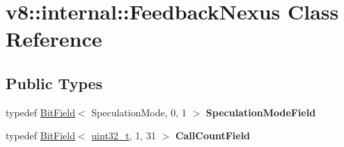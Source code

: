 \hypertarget{classv8_1_1internal_1_1FeedbackNexus}{}\section{v8\+:\+:internal\+:\+:Feedback\+Nexus Class Reference}
\label{classv8_1_1internal_1_1FeedbackNexus}
\subsection*{Public Types}
\begin{DoxyCompactItemize}
\item 
\mbox{\label{classv8_1_1internal_1_1FeedbackNexus_a691c59a60c2e5dfd819156c987736cb7}} 
typedef \mbox{\hyperlink{classv8_1_1internal_1_1BitField}{Bit\+Field}}$<$ Speculation\+Mode, 0, 1 $>$ {\bfseries Speculation\+Mode\+Field}
\item 
\mbox{\label{classv8_1_1internal_1_1FeedbackNexus_a9a255119582a0d71f400f9638e542c44}} 
typedef \mbox{\hyperlink{classv8_1_1internal_1_1BitField}{Bit\+Field}}$<$ \mbox{\hyperlink{classuint32__t}{uint32\+\_\+t}}, 1, 31 $>$ {\bfseries Call\+Count\+Field}
\end{DoxyCompactItemize}
